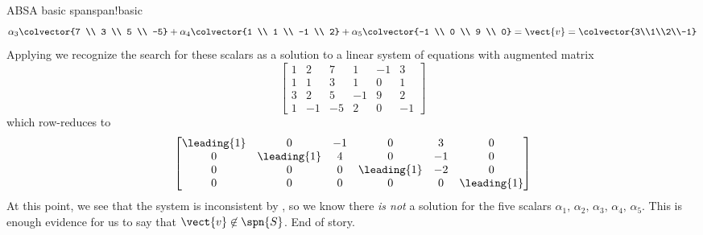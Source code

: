 \begin{example}{ABS}{A basic span}{span!basic}
\begin{equation*}
\alpha_3\colvector{7 \\ 3 \\ 5 \\ -5}+
\alpha_4\colvector{1 \\ 1 \\ -1 \\ 2}+
\alpha_5\colvector{-1 \\ 0 \\ 9 \\ 0}
=\vect{v}
=\colvector{3\\1\\2\\-1}
\end{equation*}
%
Applying  we recognize the search for these scalars as a solution to a linear system of equations with augmented matrix
%
\begin{equation*}
\begin{bmatrix}
 1 & 2 & 7 & 1 & -1 & 3 \\
 1 & 1 & 3 & 1 & 0 & 1 \\
 3 & 2 & 5 & -1 & 9 & 2 \\
 1 & -1 & -5 & 2 & 0 & -1
\end{bmatrix}
\end{equation*}
%
which row-reduces to
%
\begin{equation*}
\begin{bmatrix}
 \leading{1} & 0 & -1 & 0 & 3 & 0 \\
 0 & \leading{1} & 4 & 0 & -1 & 0 \\
 0 & 0 & 0 & \leading{1} & -2 & 0 \\
 0 & 0 & 0 & 0 & 0 & \leading{1}
\end{bmatrix}
\end{equation*}
%
At this point, we see that the system is inconsistent by , so we know there {\em is not} a solution for the five scalars $\alpha_1,\,\alpha_2,\,\alpha_3,\,\alpha_4,\,\alpha_5$.  This is enough evidence for us to say that $\vect{v}\not\in\spn{S}$.  End of story.
%
\end{example}
%
